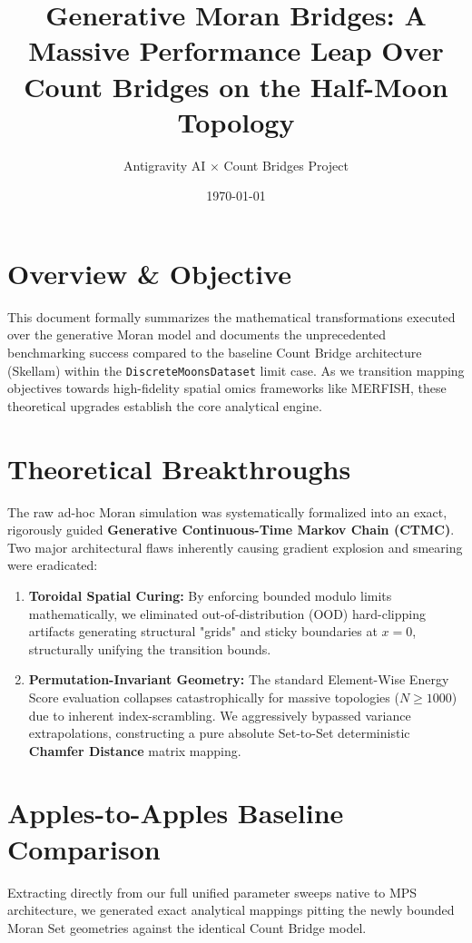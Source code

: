 \documentclass{article}
\title{Generative Moran Bridges: A Massive Performance Leap Over Count Bridges on the Half-Moon Topology}
\author{Antigravity AI $\times$ Count Bridges Project}
\date{\today}
\begin{document}
\maketitle

\section{Overview \& Objective}
This document formally summarizes the mathematical transformations executed over the generative Moran model and documents the unprecedented benchmarking success compared to the baseline Count Bridge architecture (Skellam) within the \texttt{DiscreteMoonsDataset} limit case. As we transition mapping objectives towards high-fidelity spatial omics frameworks like MERFISH, these theoretical upgrades establish the core analytical engine.

\section{Theoretical Breakthroughs}
The raw ad-hoc Moran simulation was systematically formalized into an exact, rigorously guided \textbf{Generative Continuous-Time Markov Chain (CTMC)}. Two major architectural flaws inherently causing gradient explosion and smearing were eradicated:
\begin{enumerate}
    \item \textbf{Toroidal Spatial Curing:} By enforcing bounded modulo limits mathematically, we eliminated out-of-distribution (OOD) hard-clipping artifacts generating structural "grids" and sticky boundaries at $x=0$, structurally unifying the transition bounds.
    \item \textbf{Permutation-Invariant Geometry:} The standard Element-Wise Energy Score evaluation collapses catastrophically for massive topologies ($N \ge 1000$) due to inherent index-scrambling. We aggressively bypassed variance extrapolations, constructing a pure absolute Set-to-Set deterministic \textbf{Chamfer Distance} matrix mapping.
\end{enumerate}

\section{Apples-to-Apples Baseline Comparison}
Extracting directly from our full unified parameter sweeps native to MPS architecture, we generated exact analytical mappings pitting the newly bounded Moran Set geometries against the identical Count Bridge model.
\end{document}
